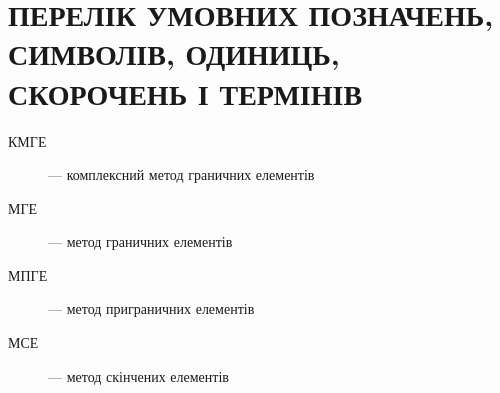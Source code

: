 \chapter{ПЕРЕЛІК УМОВНИХ ПОЗНАЧЕНЬ, СИМВОЛІВ, ОДИНИЦЬ, СКОРОЧЕНЬ І ТЕРМІНІВ}

\begin{description}
\item[КМГЕ] --- комплексний метод граничних елементів 
\item[МГЕ] --- метод граничних елементів
\item[МПГЕ] --- метод приграничних елементів
\item[МСЕ] --- метод скінчених елементів
\end{description}
